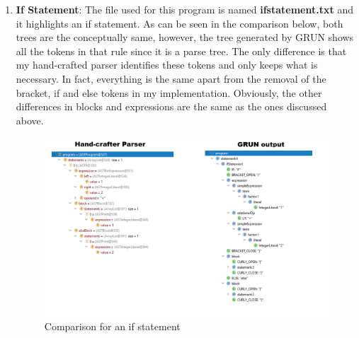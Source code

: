 \documentclass{article}
\begin{document}
\begin{enumerate}
					
					\item \textbf{If Statement}: The file used for this program is named \textbf{ifstatement.txt} and it highlights an if statement. As can be seen in the comparison below, both trees are the conceptually same, however, the tree generated by GRUN shows all the tokens in that rule since it is a parse tree. The only difference is that my hand-crafted parser identifies these tokens and only keeps what is necessary.  In fact, everything is the same apart from the removal of the bracket, if and else tokens in my implementation. Obviously, the other differences in blocks and expressions are the same as the ones discussed above.
						\begin{figure}[H]
					\centering
			 			\includegraphics[width=\textwidth]{compareif.png}
			  			\caption{Comparison for an if statement}
			  			\label{fig:comapareif}
					\end{figure}
					

\end{enumerate}
\end{document}
